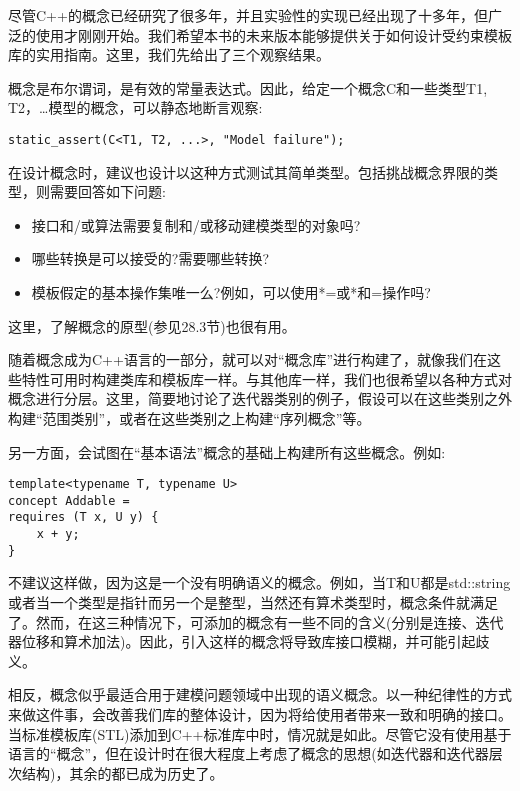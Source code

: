 
尽管C++的概念已经研究了很多年，并且实验性的实现已经出现了十多年，但广泛的使用才刚刚开始。我们希望本书的未来版本能够提供关于如何设计受约束模板库的实用指南。这里，我们先给出了三个观察结果。


概念是布尔谓词，是有效的常量表达式。因此，给定一个概念C和一些类型T1, T2，…模型的概念，可以静态地断言观察:

\begin{lstlisting}[style=styleCXX]
static_assert(C<T1, T2, ...>, "Model failure");
\end{lstlisting}

在设计概念时，建议也设计以这种方式测试其简单类型。包括挑战概念界限的类型，则需要回答如下问题:

\begin{itemize}
\item 
接口和/或算法需要复制和/或移动建模类型的对象吗?

\item 
哪些转换是可以接受的?需要哪些转换?

\item 
模板假定的基本操作集唯一么?例如，可以使用*=或*和=操作吗?
\end{itemize}

这里，了解概念的原型(参见28.3节)也很有用。


随着概念成为C++语言的一部分，就可以对“概念库”进行构建了，就像我们在这些特性可用时构建类库和模板库一样。与其他库一样，我们也很希望以各种方式对概念进行分层。这里，简要地讨论了迭代器类别的例子，假设可以在这些类别之外构建“范围类别”，或者在这些类别之上构建“序列概念”等。

另一方面，会试图在“基本语法”概念的基础上构建所有这些概念。例如:

\begin{lstlisting}[style=styleCXX]
template<typename T, typename U>
concept Addable =
requires (T x, U y) {
	x + y;
}
\end{lstlisting}

不建议这样做，因为这是一个没有明确语义的概念。例如，当T和U都是std::string或者当一个类型是指针而另一个是整型，当然还有算术类型时，概念条件就满足了。然而，在这三种情况下，可添加的概念有一些不同的含义(分别是连接、迭代器位移和算术加法)。因此，引入这样的概念将导致库接口模糊，并可能引起歧义。

相反，概念似乎最适合用于建模问题领域中出现的语义概念。以一种纪律性的方式来做这件事，会改善我们库的整体设计，因为将给使用者带来一致和明确的接口。当标准模板库(STL)添加到C++标准库中时，情况就是如此。尽管它没有使用基于语言的“概念”，但在设计时在很大程度上考虑了概念的思想(如迭代器和迭代器层次结构)，其余的都已成为历史了。

